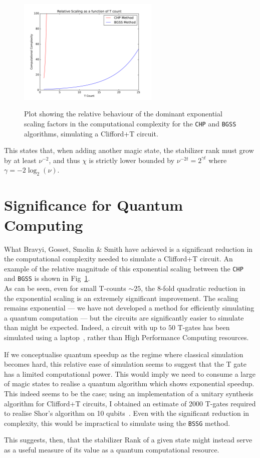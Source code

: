 \documentclass{standalone}
\begin{document}
\begin{figure}[h]
    \centering
    \includegraphics[width=0.6\textwidth]{Figures/tcount.pdf}
\label{fig:quadraticreduction}
\caption{Plot showing the relative behaviour of the dominant exponential scaling factors in the computational complexity for the \texttt{CHP} and \texttt{BGSS} algorithms, simulating a Clifford+T circuit.}
\end{figure}
This states that, when adding another magic state, the stabilizer rank must grow by at least $\nu^{-2}$, and thus $\chi$ is strictly lower bounded by $\nu^{-2t}=2^{\gamma t}$ where $\gamma=-2\log_{2}\left(\nu\right)$.

\section{Significance for Quantum Computing}\label{sec:whybgss}
What Bravyi, Gosset, Smolin \& Smith have achieved is a significant reduction in the computational complexity needed to simulate a Clifford+T circuit. An example of the relative magnitude of this exponential scaling between the \texttt{CHP} and \texttt{BGSS} is shown in Fig~\ref{fig:quadraticreduction}. \\
As can be seen, even for small T-counts $\sim 25$, the 8-fold quadratic reduction in the exponential scaling is an extremely significant improvement. The scaling remains exponential --- we have not developed a method for efficiently simulating a quantum computation --- but the circuits are significantly easier to simulate than might be expected. Indeed, a circuit with up to $50$ T-gates has been simulated using a laptop~\cite{Bravyi2015}, rather than High Performance Computing resources. 
\par
If we conceptualise quantum speedup as the regime where classical simulation becomes hard, this relative ease of simulation seems to suggest that the T gate has a limited computational power. This would imply we need to consume a large of magic states to realise a quantum algorithm which shows exponential speedup.\\
This indeed seems to be the case; using an implementation of a unitary synthesis algorithm for Clifford+T circuits, I obtained an estimate of 2000 T-gates required to realise Shor's algorithm on 10 qubits~\cite{Selinger2012}. Even with the significant reduction in complexity, this would be impractical to simulate using the \texttt{BSSG} method. 
\par
This suggests, then, that the stabilizer Rank of a given state might instead serve as a useful measure of its value as a quantum computational resource. 

\ifstandalone

\fi
\end{document}
